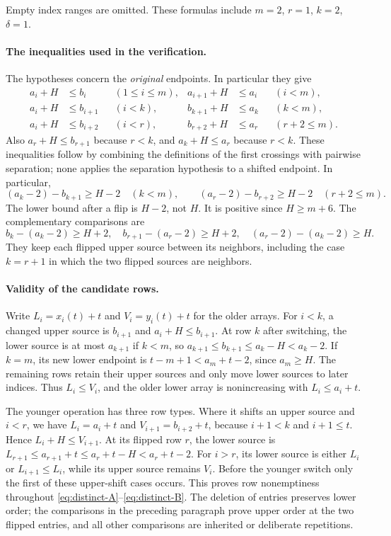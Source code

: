 Empty index ranges are omitted. These formulas include $m=2$, $r=1$, $k=2$, $\delta=1$.

\paragraph{The inequalities used in the verification.}
The hypotheses concern the \emph{original} endpoints. In particular they give
\begin{align*}
 a_i+H&\le b_i &&(1\le i\le m),&
 a_{i+1}+H&\le a_i &&(i<m),\\
 a_i+H&\le b_{i+1} &&(i<k),&
 b_{k+1}+H&\le a_k &&(k<m),\\
 a_i+H&\le b_{i+2} &&(i<r),&
 b_{r+2}+H&\le a_r &&(r+2\le m).
\end{align*}
Also $a_r+H\le b_{r+1}$ because $r<k$, and $a_k+H\le a_r$ because $r<k$. These inequalities follow by combining the definitions of the first crossings with pairwise separation; none applies the separation hypothesis to a shifted endpoint. In particular,
\[
 (a_k-2)-b_{k+1}\ge H-2\quad(k<m),\qquad
 (a_r-2)-b_{r+2}\ge H-2\quad(r+2\le m).
\]
The lower bound after a flip is $H-2$, not $H$. It is positive since $H\ge m+6$. The complementary comparisons are
\[
 b_k-(a_k-2)\ge H+2,\quad
 b_{r+1}-(a_r-2)\ge H+2,\quad
 (a_r-2)-(a_k-2)\ge H.
\]
They keep each flipped upper source between its neighbors, including the case $k=r+1$ in which the two flipped sources are neighbors.

\paragraph{Validity of the candidate rows.}
Write $L_i=x_i(t)+t$ and $V_i=y_i(t)+t$ for the older arrays. For $i<k$, a changed upper source is $b_{i+1}$ and $a_i+H\le b_{i+1}$. At row $k$ after switching, the lower source is at most $a_{k+1}$ if $k<m$, so $a_{k+1}\le b_{k+1}\le a_k-H<a_k-2$. If $k=m$, its new lower endpoint is $t-m+1<a_m+t-2$, since $a_m\ge H$. The remaining rows retain their upper sources and only move lower sources to later indices. Thus $L_i\le V_i$, and the older lower array is nonincreasing with $L_i\le a_i+t$.

The younger operation has three row types. Where it shifts an upper source and $i<r$, we have $L_i=a_i+t$ and $V_{i+1}=b_{i+2}+t$, because $i+1<k$ and $i+1\le t$. Hence $L_i+H\le V_{i+1}$. At its flipped row $r$, the lower source is $L_{r+1}\le a_{r+1}+t\le a_r+t-H<a_r+t-2$. For $i>r$, its lower source is either $L_i$ or $L_{i+1}\le L_i$, while its upper source remains $V_i$. Before the younger switch only the first of these upper-shift cases occurs. This proves row nonemptiness throughout \eqref{eq:distinct-A}--\eqref{eq:distinct-B}. The deletion of entries preserves lower order; the comparisons in the preceding paragraph prove upper order at the two flipped entries, and all other comparisons are inherited or deliberate repetitions.

